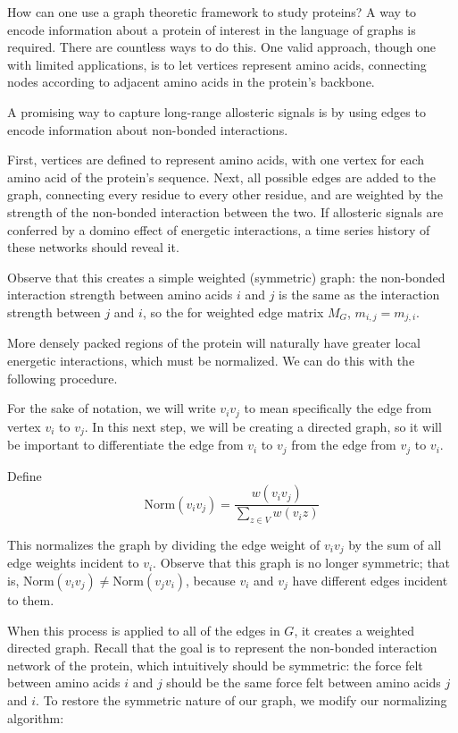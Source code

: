 How can one use a graph theoretic framework to study proteins? A way to encode information about a protein of interest in the language of graphs is required. There are countless ways to do this. One valid approach, though one with limited applications, is to let vertices represent amino acids, connecting nodes according to adjacent amino acids in the protein's backbone.

A promising way to capture long-range allosteric signals is by using edges to encode information about non-bonded interactions.

First, vertices are defined to represent amino acids, with one vertex for each amino acid of the protein's sequence. Next, all possible edges are added to the graph, connecting every residue to every other residue, and are weighted by the strength of the non-bonded interaction between the two. If allosteric signals are conferred by a domino effect of energetic interactions, a time series history of these networks should reveal it.

Observe that this creates a simple weighted (symmetric) graph: the non-bonded interaction strength between amino acids \(i\) and \(j\) is the same as the interaction strength between \(j\) and \(i\), so the for weighted edge matrix \(M_{G}\), \(m_{i, j} = m_{j, i}\).

More densely packed regions of the protein will naturally have greater local energetic interactions, which must be normalized. We can do this with the following procedure.

For the sake of notation, we will write \(v_{i}v_{j}\) to mean specifically the edge from vertex \(v_{i}\) to \(v_{j}\). In this next step, we will be creating a directed graph, so it will be important to differentiate the edge from \(v_{i}\) to \(v_{j}\) from the edge from \(v_{j}\) to \(v_{i}\).

Define
\begin{equation}
	\text{Norm}(v_{i}v_{j}) = \frac{w(v_{i}v_{j})}{\sum\limits_{z\in V}w(v_{i}z)}
\end{equation}

This normalizes the graph by dividing the edge weight of \(v_{i}v_{j}\) by the sum of all edge weights incident to \(v_{i}\). Observe that this graph is no longer symmetric; that is, \(\text{Norm}(v_{i}v_{j}) \neq \text{Norm}(v_{j}v_{i})\), because \(v_{i}\) and \(v_{j}\) have different edges incident to them.

When this process is applied to all of the edges in \(G\), it creates a weighted directed graph. Recall that the goal is to represent the non-bonded interaction network of the protein, which intuitively should be symmetric: the force felt between amino acids \(i\) and \(j\) should be the same force felt between amino acids \(j\) and \(i\). To restore the symmetric nature of our graph, we modify our normalizing algorithm:

